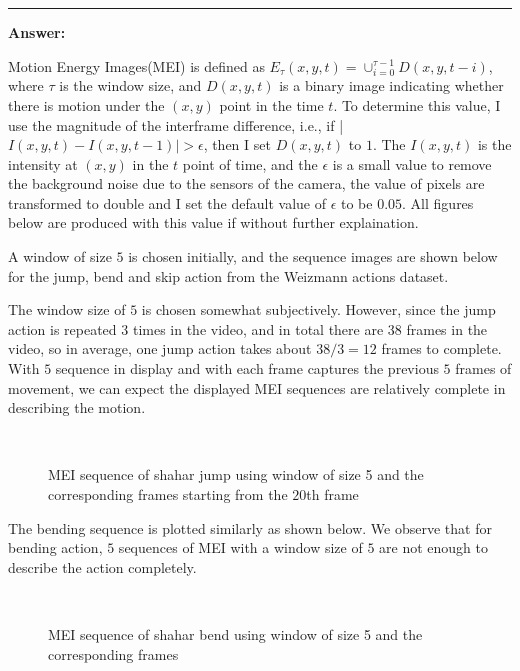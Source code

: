 \documentclass[conference]{styles/acmsiggraph}
\newenvironment{answer}{}{}
\begin{document}
\begin{answer}
	\rule{\textwidth}{0.4pt}
	
	\textbf{Answer:}

	Motion Energy Images(MEI) is defined as $E_\tau (x,y,t) = \cup_{i=0}^{\tau-1} D(x,y,t-i)$, where $\tau$ is the window size, and $D(x,y,t)$ is a binary image indicating whether there is motion under the $(x,y)$ point in the time $t$. To determine this value, I use the magnitude of the interframe difference, i.e., if |$I(x,y,t) - I(x,y,t-1)| > \epsilon$, then I set $D(x,y,t)$ to $1$. The $I(x,y,t)$ is the intensity at $(x,y)$ in the $t$ point of time, and the $\epsilon$ is a small value to remove the background noise due to the sensors of the camera, the value of pixels are transformed to double and I set the default value of $\epsilon$ to be $0.05$. All figures below are produced with this value if without further explaination.

	A window of size $5$ is chosen initially, and the sequence images are shown below for the jump, bend and skip action from the Weizmann actions dataset. 

	The window size of $5$ is chosen somewhat subjectively. However, since the jump action is repeated $3$ times in the video, and in total there are $38$ frames in the video, so in average, one jump action takes about $38/3 = 12$ frames to complete. With $5$ sequence in display and with each frame captures the previous $5$ frames of movement, we can expect the displayed MEI sequences are relatively complete in describing the motion.

	\begin{figure}[H]
		\centering
		\\
		\caption{MEI sequence of shahar jump using window of size 5 and the corresponding frames starting from the $20$th frame}
			
	\end{figure}

	The bending sequence is plotted similarly as shown below. We observe that for bending action, $5$ sequences of MEI with a window size of $5$ are not enough to describe the action completely. 
	\begin{figure}[H]
		\centering
		\\
		\caption{MEI sequence of shahar bend using window of size 5 and the corresponding frames}
	\end{figure}


\end{answer}
\end{document}
